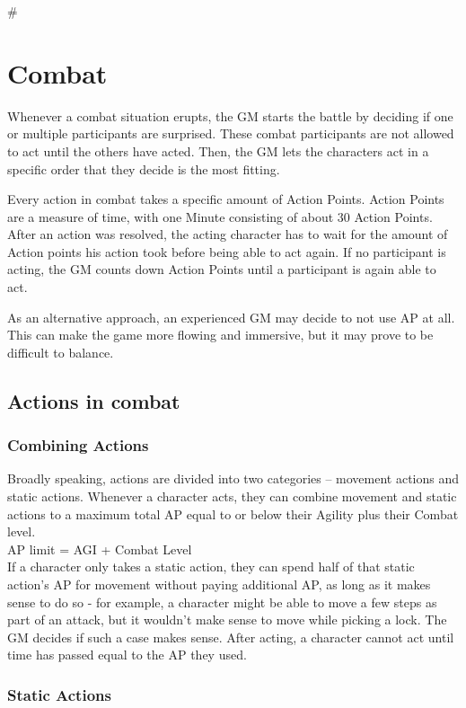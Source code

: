 #\chapter{Combat}\label{ch:combat}
Whenever a combat situation erupts, the GM starts the battle by deciding if one or multiple participants are surprised.
These combat participants are not allowed to act until the others have acted.
Then, the GM lets the characters act in a specific order that they decide is the most fitting.

Every action in combat takes a specific amount of Action Points.
Action Points are a measure of time, with one Minute consisting of about 30 Action Points.
After an action was resolved, the acting character has to wait for the amount of Action points his action took before being able to act again.
If no participant is acting, the GM counts down Action Points until a participant is again able to act.

As an alternative approach, an experienced GM may decide to not use AP at all.
This can make the game more flowing and immersive, but it may prove to be difficult to balance.


\section{Actions in combat}\label{sec:combatActions}

\subsection{Combining Actions}\label{subsec:multipleCombatActions}
Broadly speaking, actions are divided into two categories -- movement actions and static actions.
Whenever a character acts, they can combine movement and static actions to a maximum total AP equal to or below their Agility plus their Combat level.\\
AP limit = AGI + Combat Level\\
If a character only takes a static action, they can spend half of that static action's AP for movement without paying additional AP, as long as it makes sense to do so - for example, a character might be able to move a few steps as part of an attack, but it wouldn't make sense to move while picking a lock.
The GM decides if such a case makes sense.
After acting, a character cannot act until time has passed equal to the AP they used.

\subsection{Static Actions}\label{subsec:staticCombatActions}

